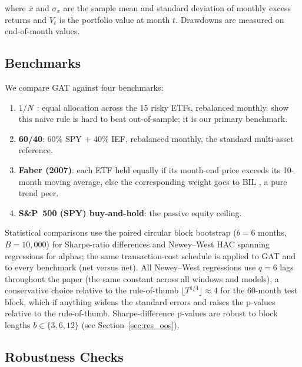 where $\bar{x}$ and $\sigma_x$ are the sample mean and standard deviation of
monthly excess returns and $V_t$ is the portfolio value at month $t$. Drawdowns
are measured on end-of-month values.

\subsection{Benchmarks}
\label{sec:benchmarks}

We compare GAT against four benchmarks:
\begin{enumerate}
    \item \textbf{$1/N$ \citep{demiguel2009}}: equal allocation across the 15 risky
          ETFs, rebalanced monthly. \citet{demiguel2009} show this naive rule is
          hard to beat out-of-sample; it is our primary benchmark.
    \item \textbf{60/40}: 60\% SPY + 40\% IEF, rebalanced monthly, the standard
          multi-asset reference.
    \item \textbf{Faber (2007)}: each ETF held equally if its month-end price
          exceeds its 10-month moving average, else the corresponding weight goes
          to BIL \citep{faber2007}, a pure trend peer.
    \item \textbf{S\&P~500 (SPY) buy-and-hold}: the passive equity ceiling.
\end{enumerate}
Statistical comparisons use the paired circular block bootstrap ($b = 6$ months,
$B = 10{,}000$) for Sharpe-ratio differences and Newey--West HAC spanning
regressions for alphas; the same transaction-cost schedule is applied to
GAT and to every benchmark (net versus net).
All Newey--West regressions use $q = 6$ lags throughout the paper (the same
constant across all windows and models), a conservative choice relative to the
rule-of-thumb $\lfloor T^{1/4} \rfloor \approx 4$ for the 60-month test block,
which if anything widens the standard errors and raises the p-values relative to
the rule-of-thumb. Sharpe-difference p-values are robust to block lengths $b \in
\{3,6,12\}$ (see Section~\ref{sec:res_oos}).

\subsection{Robustness Checks}
\label{sec:robustness}

